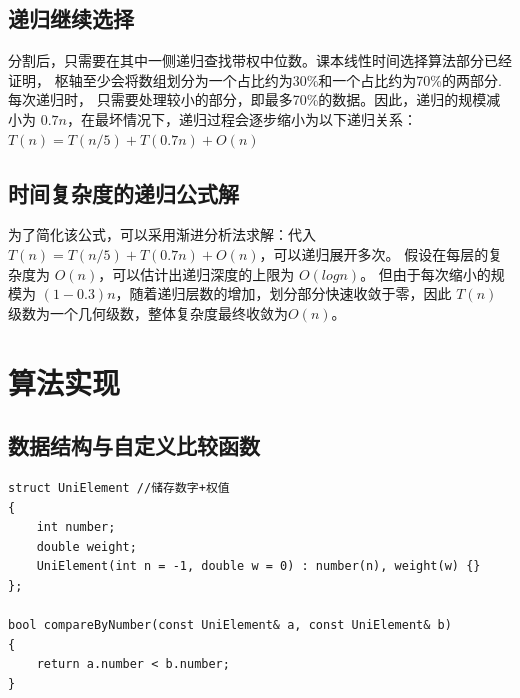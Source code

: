 \documentclass[UTF8]{ctexart}
\begin{document}
\subsection{递归继续选择}
分割后，只需要在其中一侧递归查找带权中位数。课本线性时间选择算法部分已经证明，
枢轴至少会将数组划分为一个占比约为30\%和一个占比约为70\%的两部分.每次递归时，
只需要处理较小的部分，即最多70\%的数据。因此，递归的规模减小为 
$0.7n$，在最坏情况下，递归过程会逐步缩小为以下递归关系：
$T(n)=T(n/5)+T(0.7n)+O(n)$

\subsection{时间复杂度的递归公式解}
为了简化该公式，可以采用渐进分析法求解：代入 $T(n)=T(n/5)+T(0.7n)+O(n)$，可以递归展开多次。
假设在每层的复杂度为 $O(n)$，可以估计出递归深度的上限为 $O(logn)$。
但由于每次缩小的规模为 $(1−0.3)n$，随着递归层数的增加，划分部分快速收敛于零，因此
$T(n)$ 级数为一个几何级数，整体复杂度最终收敛为$O(n)$。


\section{算法实现}
\subsection{数据结构与自定义比较函数}
\begin{lstlisting}
struct UniElement //储存数字+权值
{
    int number;
    double weight;
    UniElement(int n = -1, double w = 0) : number(n), weight(w) {}
};

bool compareByNumber(const UniElement& a, const UniElement& b) 
{
    return a.number < b.number;
}

    
\end{lstlisting}
\end{document}
